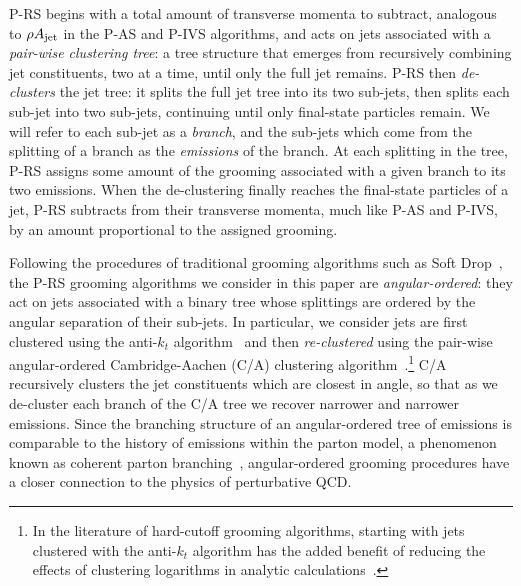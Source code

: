 \documentclass[letterpaper,11pt]{article}
\begin{document}
P-RS begins with a total amount of transverse momenta to subtract, analogous to \(\rho A_{\rm jet}\) in the P-AS and P-IVS algorithms, and acts on jets associated with a \textit{pair-wise clustering tree}:
%
a tree structure that emerges from recursively combining jet constituents, two at a time, until only the full jet remains.
%
P-RS then \textit{de-clusters} the jet tree:
%
it splits the full jet tree into its two sub-jets, then splits each sub-jet into two sub-jets, continuing until only final-state particles remain.
%
We will refer to each sub-jet as a \textit{branch}, and the sub-jets which come from the splitting of a branch as the \textit{emissions} of the branch.
%
At each splitting in the tree, P-RS assigns some amount of the grooming associated with a given branch to its two emissions.
%
When the de-clustering finally reaches the final-state particles of a jet, P-RS subtracts from their transverse momenta, much like P-AS and P-IVS, by an amount proportional to the assigned grooming.


Following the procedures of traditional grooming algorithms such as Soft Drop~\cite{Larkoski:2014wba}, the P-RS grooming algorithms we consider in this paper are \textit{angular-ordered}:
%
they act on jets associated with a binary tree whose splittings are ordered by the angular separation of their sub-jets.
%
In particular, we consider jets are first clustered using the anti-\(k_t\) algorithm~\cite{Cacciari:2008gp} and then \textit{re-clustered} using the pair-wise angular-ordered Cambridge-Aachen (C/A) clustering algorithm~\cite{Dokshitzer:1997in}.\footnote{
In the literature of hard-cutoff grooming algorithms, starting with jets clustered with the anti-\(k_t\) algorithm has the added benefit of reducing the effects of clustering logarithms in analytic calculations~\cite{Larkoski:2014wba}.
}
%
C/A recursively clusters the jet constituents which are closest in angle, so that as we de-cluster each branch of the C/A tree we recover narrower and narrower emissions.
%
Since the branching structure of an angular-ordered tree of emissions is comparable to the history of emissions within the parton model, a phenomenon known as coherent parton branching~\cite{Collins:2011zzd}, angular-ordered grooming procedures have a closer connection to the physics of perturbative QCD.
\end{document}
